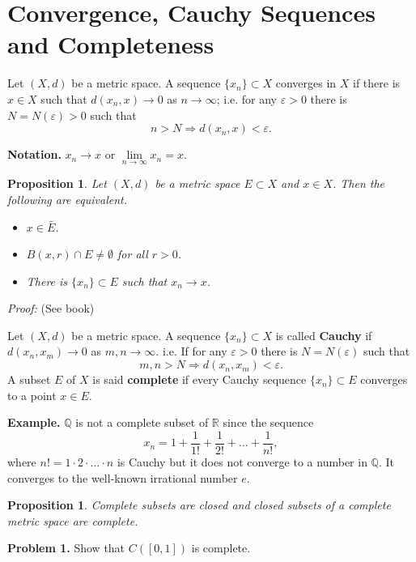 \documentclass[12pt]{report}
\newtheorem{prop}[theorem]{Proposition}
\begin{document}
\section{Convergence, Cauchy Sequences and
Completeness}
Let $(X, d)$ be a metric space.  A sequence $\{x_n\} \subset X$
converges in $X$ if there is $x \in X$ such that $d(x_n, x)
\longrightarrow 0$ as $n \to \infty$; i.e. for any $\varepsilon > 0$
there is $N = N (\varepsilon) > 0$ such that
\[ n > N \Longrightarrow d(x_n, x) < \varepsilon.
\]

\noindent
{\bf Notation.}  $x_n \longrightarrow x$ or $\lim\limits_{n \to
\infty} x_n = x.$

\begin{prop} 
\label{pr:closure}
  Let $(X, d)$ be a metric space  $E
\subset X$ and $x \in X$.  Then the following are equivalent.
\begin{itemize}
\item[1.]  $x \in \bar E$.
\item[2.]  $B(x, r) \cap E \ne \emptyset$ for all $r > 0$.
\item[3.]  There is $\{x_n\} \subset E$ such that $x_n \longrightarrow
x$.
\end{itemize}
\end{prop}
\textit{Proof:}  (See book)

\medskip
\noindent
 Let $(X, d)$ be a metric space.  A sequence  $\{x_n\} \subset
X$ is called
\textbf{Cauchy} if $d(x_n, x_m) \longrightarrow 0$ as $m, n 
\longrightarrow
\infty$.  i.e. If for any $\varepsilon > 0$ there is $ N = N(\varepsilon)$
such that
\[ m, n > N \Longrightarrow d(x_n, x_m) < \varepsilon.
\] A subset $E$ of $X$ is said \textbf{complete} if every Cauchy
sequence $\{x_n\}
\subset E$ converges to a point $x \in E$.

\bigskip
\noindent
\textbf{Example.}  $\mathbb{Q}$ is not a complete subset of
$\mathbb{R}$ since the sequence
\[ x_n = 1 + \frac{1}{1!} + \frac{1}{2!} +\dots + \frac{1}{n!}, 
\] where $n! = 1 \cdot 2\cdot \dots \cdot n$ is Cauchy but it does
not converge to a number in $\mathbb{Q}$.  It converges to the
well-known irrational number $e$.

\begin{prop} 
\label{pr:closed-complete} 
Complete subsets are closed and
closed subsets of a complete metric space are complete.
\end{prop}

\medskip
\noindent
\textbf{Problem 1.}  Show that $C([0,1])$ is complete.
\end{document}
